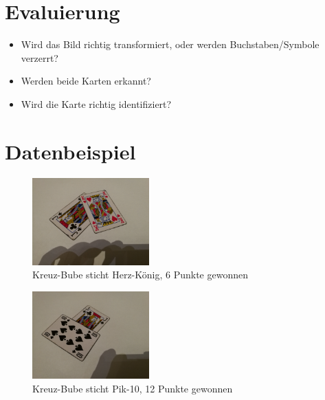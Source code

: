 \documentclass[deutsch]{scrartcl}
\begin{document}
\section{Evaluierung}
\begin{itemize}
	\item Wird das Bild richtig transformiert, oder werden Buchstaben/Symbole verzerrt?
	\item Werden beide Karten erkannt?
	\item Wird die Karte richtig identifiziert?
\end{itemize}
\section{Datenbeispiel}
\begin{figure}[h!]
 \centering
 \includegraphics[width=0.4\textwidth]{datenbeispiel.jpg}
 \caption{Kreuz-Bube sticht Herz-König, 6 Punkte gewonnen}
 \label{fig:img}
\end{figure}
\begin{figure}[h!]
 \centering
 \includegraphics[width=0.4\textwidth]{datenbeispiel2.jpg}
 \caption{Kreuz-Bube sticht Pik-10, 12 Punkte gewonnen}
 \label{fig:img}
\end{figure}
\newpage
\end{document}
